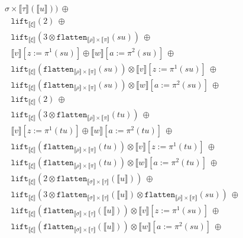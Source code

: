 \documentclass[a4paper,UKenglish,cleveref,autoref,numberwithinsect]{lipics-v2019}
\theoremstyle{definition}
\newcommand{\flatten}{\mathtt{flatten}}
\newcommand{\lift}{\mathtt{lift}}
\newcommand{\typeinterpret}[1]{\llbracket #1 \rrbracket}
\newcommand{\interpret}[1]{\llbracket #1 \rrbracket}
\begin{document}
\begin{itemize}
\[\begin{array}{l}
{{    \sigma} \times \typeinterpret{\tau}}(\interpret{u}))\ \oplus \\
  \phantom{A}
    \lift_{\typeinterpret{\xi}}(2)\ \oplus \\
  \phantom{A}
    \lift_{\typeinterpret{\xi}}(3 \otimes \flatten_{
    \typeinterpret{\rho} \times \typeinterpret{\pi}}(su))\ \oplus \\
  \phantom{A}
    \interpret{v}[z:=\pi^1(su)] \oplus
    \interpret{w}[a:=\pi^2(su)]\ \oplus \\
  \phantom{A}
    \lift_{\typeinterpret{\xi}}(\flatten_{\typeinterpret{\rho} \times
    \typeinterpret{\pi}}(su)) \otimes \interpret{v}[z:=\pi^1(su)]\ 
    \oplus \\
  \phantom{A}
    \lift_{\typeinterpret{\xi}}(\flatten_{\typeinterpret{\rho}
    \times \typeinterpret{\pi}}(su)) \otimes \interpret{w}[a:=\pi^2(su)]
    \ \oplus \\
  \phantom{A}
    \lift_{\typeinterpret{\xi}}(2)\ \oplus \\
  \phantom{A}
    \lift_{\typeinterpret{\xi}}(3 \otimes \flatten_{
    \typeinterpret{\rho} \times \typeinterpret{\pi}}(tu))\ \oplus \\
  \phantom{A}
    \interpret{v}[z:=\pi^1(tu)] \oplus
    \interpret{w}[a:=\pi^2(tu)]\ \oplus \\
  \phantom{A}
    \lift_{\typeinterpret{\xi}}(\flatten_{\typeinterpret{\rho} \times
    \typeinterpret{\pi}}(tu)) \otimes \interpret{v}[z:=\pi^1(tu)]\ 
    \oplus \\
  \phantom{A}
    \lift_{\typeinterpret{\xi}}(\flatten_{\typeinterpret{\rho}
    \times \typeinterpret{\pi}}(tu)) \otimes \interpret{w}[a:=\pi^2(tu)]
    \ \oplus \\
  \phantom{A}
    \lift_{\typeinterpret{\xi}}(2 \otimes \flatten_{
    \typeinterpret{\sigma} \times \typeinterpret{\tau}}(
    \interpret{u}))\ \oplus \\
  \phantom{A}
    \lift_{\typeinterpret{\xi}}(3 \otimes \flatten_{
    \typeinterpret{\sigma} \times \typeinterpret{\tau}}(
    \interpret{u}) \otimes \flatten_{
    \typeinterpret{\rho} \times \typeinterpret{\pi}}(su))\ \oplus \\
  \phantom{A}
    \lift_{\typeinterpret{\xi}}(\flatten_{\typeinterpret{\sigma}
    \times \typeinterpret{\tau}}(\interpret{u})) \otimes
    \interpret{v}[z:=\pi^1(su)]\ \oplus \\
  \phantom{A}
    \lift_{\typeinterpret{\xi}}(\flatten_{\typeinterpret{\sigma}
    \times \typeinterpret{\tau}}(\interpret{u})) \otimes
    \interpret{w}[a:=\pi^2(su)]\ \oplus \\

\end{array}\]
\end{itemize}
\end{document}
